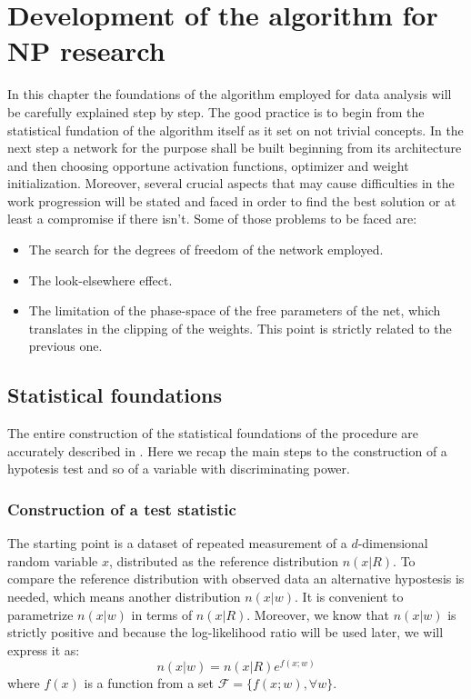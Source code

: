 \chapter{Development of the algorithm for NP research}

In this chapter the foundations of the algorithm employed for data analysis will be carefully explained step by step. The good practice is to begin from the statistical fundation of the algorithm itself as it set on not trivial concepts. In the next step a network for the purpose shall be built beginning from its architecture and then choosing opportune activation functions, optimizer and weight initialization. Moreover, several crucial aspects that may cause difficulties in the work progression will be stated and faced in order to find the best solution or at least a compromise if there isn't. Some of those problems to be faced are:
\begin{itemize}
	\item The search for the degrees of freedom of the network employed.
	\item The look-elsewhere effect.
	\item The limitation of the phase-space of the free parameters of the net, which translates in the clipping of the weights. This point is strictly related to the previous one.
\end{itemize}





\section{Statistical foundations}
The entire construction of the statistical foundations of the procedure are accurately described in \cite{wulzer}. Here we recap the main steps to the construction of a hypotesis test and so of a variable with discriminating power. 



\subsection{Construction of a test statistic}
The starting point is a dataset of repeated measurement of a $d$-dimensional random variable $x$, distributed as the reference distribution $n(x|R)$. To compare the reference distribution with observed data an alternative hypostesis is needed, which means another distribution $n(x|w)$. It is convenient to parametrize $n(x|w)$ in terms of $n(x|R)$. Moreover, we know that $n(x|w)$ is strictly positive and because the log-likelihood ratio will be used later, we will express it as:
\begin{equation}
	n(x|w) = n(x|R) e^{f(x;w)}
\end{equation}
where $f(x)$ is a function from a set $\mathcal{F} = \{ f(x;w), \forall w \}$.

